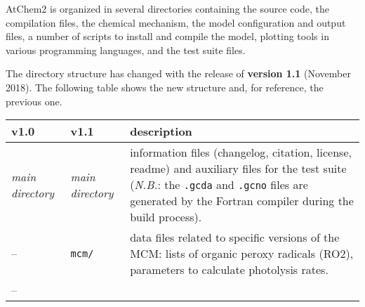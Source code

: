 AtChem2 is organized in several directories containing the source code,
the compilation files, the chemical mechanism, the model configuration
and output files, a number of scripts to install and compile the model,
plotting tools in various programming languages, and the test suite
files.

The directory structure has changed with the release of \textbf{version
1.1} (November 2018). The following table shows the new structure and,
for reference, the previous one.

\begin{longtable}[]{@{}lll@{}}
\begin{minipage}[b]{0.20\columnwidth}\raggedright
v1.0\strut
\end{minipage} & \begin{minipage}[b]{0.24\columnwidth}\raggedright
v1.1\strut
\end{minipage} & \begin{minipage}[b]{0.48\columnwidth}\raggedright
description\strut
\end{minipage}\tabularnewline
\endhead
\begin{minipage}[t]{0.20\columnwidth}\raggedright
\emph{main directory}\strut
\end{minipage} & \begin{minipage}[t]{0.24\columnwidth}\raggedright
\emph{main directory}\strut
\end{minipage} & \begin{minipage}[t]{0.48\columnwidth}\raggedright
information files (changelog, citation, license, readme) and auxiliary
files for the test suite (\emph{N.B.}: the \texttt{.gcda} and
\texttt{.gcno} files are generated by the Fortran compiler during the
build process).\strut
\end{minipage}\tabularnewline
\begin{minipage}[t]{0.20\columnwidth}\raggedright
--\strut
\end{minipage} & \begin{minipage}[t]{0.24\columnwidth}\raggedright
\texttt{mcm/}\strut
\end{minipage} & \begin{minipage}[t]{0.48\columnwidth}\raggedright
data files related to specific versions of the MCM: lists of organic
peroxy radicals (RO2), parameters to calculate photolysis rates.\strut
\end{minipage}\tabularnewline
\begin{minipage}[t]{0.20\columnwidth}\raggedright
--\strut
\end{minipage} & \begin{minipage}[t]{0.24\columnwidth}\raggedright

\end{minipage}
\end{longtable}
